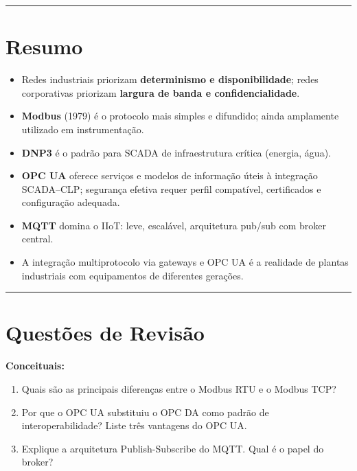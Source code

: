 \begin{center}\rule{0.5\linewidth}{0.5pt}\end{center}

\section{Resumo}\label{resumo}

\begin{itemize}
\tightlist
\item
  Redes industriais priorizam \textbf{determinismo e disponibilidade}; redes corporativas priorizam \textbf{largura de banda e confidencialidade}.
\item
  \textbf{Modbus} (1979) é o protocolo mais simples e difundido; ainda amplamente utilizado em instrumentação.
\item
  \textbf{DNP3} é o padrão para SCADA de infraestrutura crítica (energia, água).
\item
  \textbf{OPC UA} oferece serviços e modelos de informação úteis à integração SCADA--CLP; segurança efetiva requer perfil compatível, certificados e configuração adequada.
\item
  \textbf{MQTT} domina o IIoT: leve, escalável, arquitetura pub/sub com broker central.
\item
  A integração multiprotocolo via gateways e OPC UA é a realidade de plantas industriais com equipamentos de diferentes gerações.
\end{itemize}

\begin{center}\rule{0.5\linewidth}{0.5pt}\end{center}

\section{Questões de Revisão}\label{questuxf5es-de-revisuxe3o}

\textbf{Conceituais:}

\begin{enumerate}
\def\labelenumi{\arabic{enumi}.}
\tightlist
\item
  Quais são as principais diferenças entre o Modbus RTU e o Modbus TCP?
\item
  Por que o OPC UA substituiu o OPC DA como padrão de interoperabilidade? Liste três vantagens do OPC UA.
\item
  Explique a arquitetura Publish-Subscribe do MQTT. Qual é o papel do broker?
\end{enumerate}

